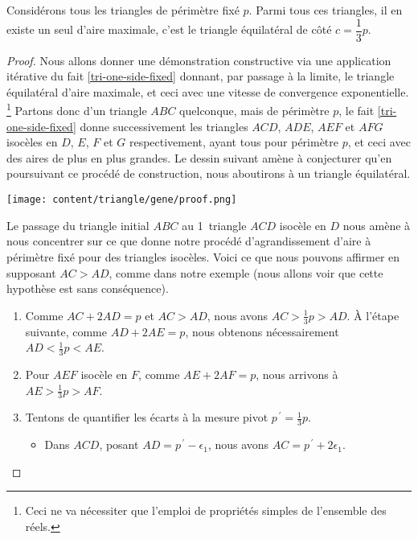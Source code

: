 \begin{fact} \label{iso-tri}
	Considérons tous les triangles de périmètre fixé $p$. Parmi tous ces triangles, il en existe un seul d'aire maximale, c'est le triangle équilatéral de côté $c = \dfrac13 p$.
\end{fact}


\begin{proof}	
	Nous allons donner une démonstration constructive via une application itérative du fait \ref{tri-one-side-fixed} donnant, par passage à la limite, le triangle équilatéral d'aire maximale, et ceci avec une vitesse de convergence exponentielle.%
	\footnote{
		Ceci ne va nécessiter que l'emploi de propriétés simples de l'ensemble des réels.
	}
	Partons donc d'un triangle $ABC$ quelconque, mais de périmètre $p$, le fait \ref{tri-one-side-fixed} donne successivement les triangles $ACD$, $ADE$, $AEF$ et $AFG$ isocèles en $D$, $E$, $F$ et  $G$ respectivement, ayant tous pour périmètre $p$, et ceci avec des aires de plus en plus grandes.  
	Le dessin suivant amène à conjecturer qu'en poursuivant ce procédé de construction, nous aboutirons  à un triangle équilatéral.

	\begin{center}
		\texttt{[image: content/triangle/gene/proof.png]}
	\end{center} 

	
	Le passage du triangle initial $ABC$ au 1\ier\ triangle $ACD$ isocèle en $D$ nous amène à nous concentrer sur ce que donne notre procédé d'agrandissement d'aire à périmètre fixé pour des triangles isocèles. 
	Voici ce que nous pouvons affirmer en supposant $AC > AD$, comme dans notre exemple (nous allons voir que cette hypothèse est sans conséquence).
	\begin{enumerate}
		\item Comme $AC + 2 AD = p$ et $AC > AD$, nous avons $AC > \frac13 p > AD$.
		À l'étape suivante, comme $AD + 2 AE = p$, nous obtenons nécessairement $AD < \frac13 p < AE$.


		\item Pour $AEF$ isocèle en $F$, comme $AE + 2AF = p$, nous arrivons à  $AE > \frac13 p > AF$.
		
		
		\item \label{tri-equi-conv}
		Tentons de quantifier les écarts à la mesure pivot $p^{\,\prime} = \frac13 p$. 
		\begin{itemize}
			\item Dans $ACD$, posant $AD = p^{\,\prime} - \epsilon_1$, nous avons $AC = p^{\,\prime} + 2 \epsilon_1$.


\end{itemize}
\end{enumerate}
\end{proof}
